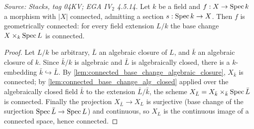 \begin{theorem}\leanok
  \label{thm:geometrically_connected_of_section}
  \textit{Source: Stacks, tag 04KV; EGA IV\(_2\) 4.5.14.}
  Let \(k\) be a field and \(f : X \to \operatorname{Spec} k\) a morphism with
  \(|X|\) connected, admitting a section \(s : \operatorname{Spec} k \to X\). Then
  \(f\) is geometrically connected: for every field extension \(L/k\)
  the base change \(X \times_k \operatorname{Spec} L\) is connected.
\end{theorem}
\begin{proof}
  \leanok
  Let \(L/k\) be arbitrary, \(\bar L\) an algebraic closure of \(L\),
  and \(\bar k\) an algebraic closure of \(k\). Since \(\bar k/k\) is
  algebraic and \(\bar L\) is algebraically closed, there is a
  \(k\)-embedding \(\bar k \hookrightarrow \bar L\). By
  \cref{lem:connected_base_change_algebraic_closure},
  \(X_{\bar k}\) is connected; by
  \cref{lem:connected_base_change_alg_closed} applied over the
  algebraically closed field \(\bar k\) to the extension
  \(\bar L / \bar k\), the scheme
  \(X_{\bar L} = X_{\bar k} \times_{\bar k} \operatorname{Spec} \bar L\) is
  connected. Finally the projection \(X_{\bar L} \to X_L\) is
  surjective (base change of the surjection
  \(\operatorname{Spec} \bar L \to \operatorname{Spec} L\)) and continuous, so \(X_L\) is the
  continuous image of a connected space, hence connected.
\end{proof}


